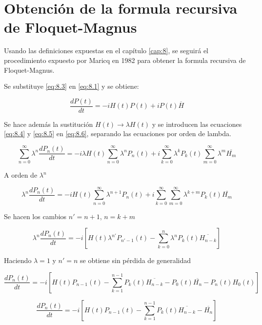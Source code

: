 \chapter{Obtención de la formula recursiva de Floquet-Magnus}\label{apendice:C}

Usando las definiciones expuestas en el capítulo \ref{cap:8}, se seguirá el procedimiento expuesto por Maricq en 1982 \cite{maricq} para obtener la formula recursiva de Floquet-Magnus.

Se substituye \ref{eq:8.3} en \ref{eq:8.1} y se obtiene:

\begin{equation}\label{eq:D.1}
    \frac{dP(t)}{dt}=-iH(t)P(t)+iP(t)\overline{H}
\end{equation}

Se hace además la sustitución $H(t)  \rightarrow \lambda H(t)$ y se introducen las ecuaciones \ref{eq:8.4} y \ref{eq:8.5} en \ref{eq:8.6}, separando las ecuaciones por orden de lambda.

\begin{equation}\label{eq:D.2}
    \sum^{\infty}_{n=0}\lambda^n\frac{dP_n(t)}{dt}=-i\lambda H(t)\sum^{\infty}_{n=0}\lambda^nP_n(t)+i\sum^{\infty}_{k=0}\lambda^kP_k(t)\sum^{\infty}_{m=0}\lambda^m\overline{H_m}
\end{equation}

A orden de $\lambda^n$

\begin{equation}\label{eq:D.3}
    \lambda^n\frac{dP_n(t)}{dt}=-i H(t)\sum^{\infty}_{n=0}\lambda^{n+1}P_n(t)+i\sum^{\infty}_{k=0}\sum^{\infty}_{m=0}\lambda^{k+m}P_k(t)\overline{H_m}
\end{equation}

Se hacen los cambios $n'=n+1$, $n=k+m$

\begin{equation}\label{eq:D.4}
    \lambda^n\frac{dP_n(t)}{dt}=-i\left[ H(t)\lambda^{n'}P_{n'-1}(t)-\sum^{n}_{k=0}\lambda^{n}P_k(t)\overline{H_{n-k}}\right]
\end{equation}

Haciendo $\lambda=1$ y $n'=n$ se obtiene sin pérdida de generalidad

\begin{equation}\label{eq:D.5}
    \frac{dP_n(t)}{dt}=-i\left[ H(t)P_{n-1}(t)-\sum^{n-1}_{k=1}P_k(t)\overline{H_{n-k}}-P_{0}(t)\overline{H_n}-P_n(t)H_0(t)\right]
\end{equation}

\begin{equation}\label{eq:D.6}
    \frac{dP_n(t)}{dt}=-i\left[ H(t)P_{n-1}(t)-\sum^{n-1}_{k=1}P_k(t)\overline{H_{n-k}}-\overline{H_n}\right]
\end{equation}

